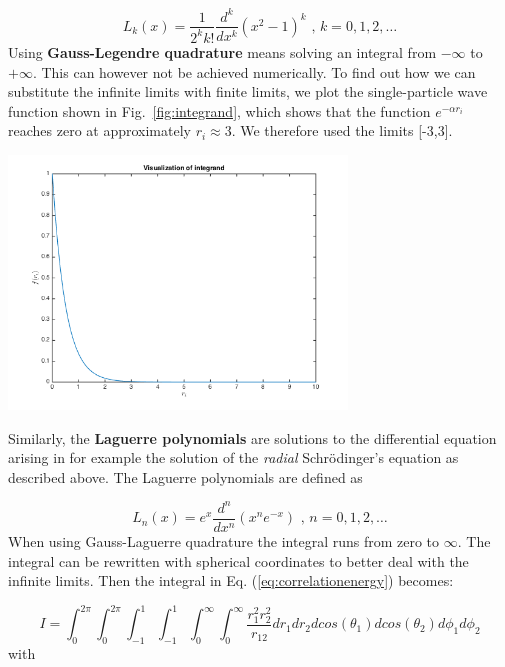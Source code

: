 \documentclass{article}
\begin{document}
\begin{multicols}{2}
\begin{equation}
	L_k(x) = \frac{1}{2^k k!} \frac{d^k}{dx^k} (x^2 - 1)^k \textrm{ , } k = 0,1,2, \dots
\end{equation}
Using \textbf{Gauss-Legendre quadrature} means solving an integral from $- \infty$ to $+ \infty$. This can however not be achieved numerically. To find out how we can substitute the infinite limits with finite limits, we plot the single-particle wave function shown in Fig.~\ref{fig:integrand}, which shows that the function $e^{-\alpha r_i}$ reaches zero at approximately $r_i \approx 3$. We therefore used the limits [-3,3].

\begin{center}
	\includegraphics[width=90mm]{integrand.png} 	
	\label{fig:integrand}
\end{center}


Similarly, the \textbf{Laguerre polynomials} are solutions to the differential equation arising in for example the solution of the \textit{radial} Schr\"{o}dinger's equation as described above. The Laguerre polynomials are defined as

\begin{equation}
	L_n(x) = e^x \frac{d^n}{dx^n} (x^n e^{-x}) \textrm{ , } n = 0,1,2, \dots
\end{equation}
When using Gauss-Laguerre quadrature the integral runs from zero to $\infty$. The integral can be rewritten with spherical coordinates to better deal with the infinite limits. Then the integral in Eq. (\ref{eq:correlationenergy}) becomes:

\begin{equation}
	I = \int_0^{2\pi} \int_0^{2\pi}  \int_{-1}^1 \int_{-1}^1   \int_0^{\infty} \int_0^{\infty}    \frac{r_1^2 r_2^2}{r_{12}} dr_1  dr_2 dcos(\theta_1)dcos(\theta_2)d\phi_1d\phi_2
\end{equation}
with


\end{multicols}
\end{document}
